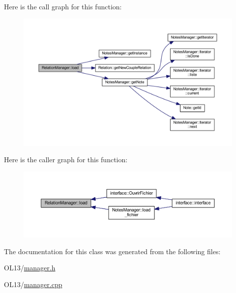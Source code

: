 Here is the call graph for this function\+:\nopagebreak
\begin{figure}[H]
\begin{center}
\leavevmode
\includegraphics[width=350pt]{class_relation_manager_a37273bc4c1d223bf99ff10ba7feba50a_cgraph}
\end{center}
\end{figure}
Here is the caller graph for this function\+:
\nopagebreak
\begin{figure}[H]
\begin{center}
\leavevmode
\includegraphics[width=350pt]{class_relation_manager_a37273bc4c1d223bf99ff10ba7feba50a_icgraph}
\end{center}
\end{figure}


The documentation for this class was generated from the following files\+:\begin{DoxyCompactItemize}
\item 
O\+L13/\hyperlink{manager_8h}{manager.\+h}\item 
O\+L13/\hyperlink{manager_8cpp}{manager.\+cpp}\end{DoxyCompactItemize}
